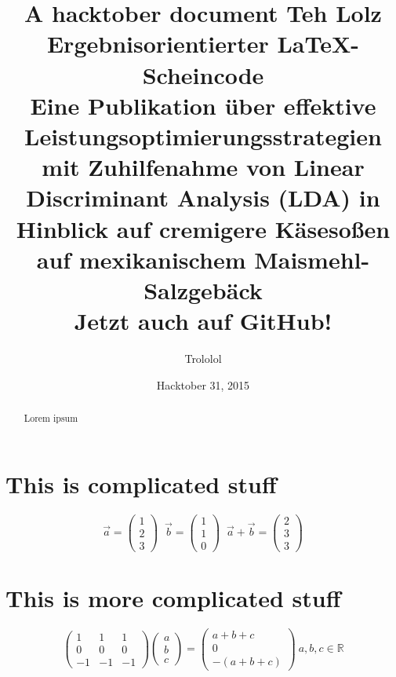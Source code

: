 \documentclass{article}
\title{A hacktober document}
\author{Trololol}
\date{Hacktober 31, 2015}
\title{
    Teh Lolz\\
  \vspace{7mm}
    Ergebnisorientierter {\LaTeX}-Scheincode\\
  \vspace{5mm}
  \small {
    	Eine Publikation \"uber effektive Leistungsoptimierungsstrategien mit Zuhilfenahme von Linear Discriminant Analysis (LDA) in Hinblick auf cremigere K\"aseso\ss{}en auf mexikanischem Maismehl-Salzgeb\"ack\\
    }
  \vspace{1cm}
  \large {
        Jetzt auch auf GitHub!\\
      \vspace{1cm}
    }
}
\begin{document}
	\maketitle	

	\thispagestyle{empty}
	\begin{abstract}
		Lorem ipsum
	\end{abstract}
	
	\newpage
	
	\section{This is complicated stuff}
	\begin{equation*}
		\vec{a} =
		\begin{pmatrix}
		1 \\
		2 \\
		3
		\end{pmatrix}\;\;
		\vec{b} =
		\begin{pmatrix}
		1 \\
		1 \\
		0
		\end{pmatrix}\;\;
		\vec{a} + \vec{b} = \begin{pmatrix}
		2 \\
		3 \\
		3
		\end{pmatrix}
	\end{equation*}
	
	\newpage
	
	\section{This is more complicated stuff}
	\begin{equation}
		\begin{pmatrix}
		1 & 1 & 1 \\
		0 & 0 & 0 \\
		-1 & -1 & -1
		\end{pmatrix}
		\begin{pmatrix}
		a \\
		b \\
		c
		\end{pmatrix} =
		\begin{pmatrix}
		a + b + c \\
		0 \\
		-(a + b + c)
		\end{pmatrix} \>
		a, b, c \in \mathbb{R}
	\end{equation}
\end{document}
